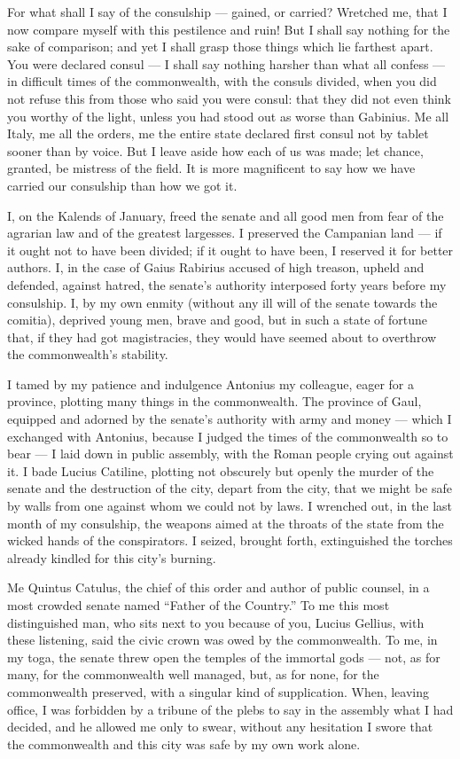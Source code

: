  For what shall I say of the consulship — gained, or carried? Wretched me, that I now compare myself with this pestilence and ruin! But I shall say nothing for the sake of comparison; and yet I shall grasp those things which lie farthest apart. You were declared consul — I shall say nothing harsher than what all confess — in difficult times of the commonwealth, with the consuls divided, when you did not refuse this from those who said you were consul: that they did not even think you worthy of the light, unless you had stood out as worse than Gabinius. Me all Italy, me all the orders, me the entire state declared first consul not by tablet sooner than by voice. But I leave aside how each of us was made; let chance, granted, be mistress of the field. It is more magnificent to say how we have carried our consulship than how we got it.

 I, on the Kalends of January, freed the senate and all good men from fear of the agrarian law and of the greatest largesses. I preserved the Campanian land — if it ought not to have been divided; if it ought to have been, I reserved it for better authors. I, in the case of Gaius Rabirius accused of high treason, upheld and defended, against hatred, the senate's authority interposed forty years before my consulship. I, by my own enmity (without any ill will of the senate towards the comitia), deprived young men, brave and good, but in such a state of fortune that, if they had got magistracies, they would have seemed about to overthrow the commonwealth's stability.

 I tamed by my patience and indulgence Antonius my colleague, eager for a province, plotting many things in the commonwealth. The province of Gaul, equipped and adorned by the senate's authority with army and money — which I exchanged with Antonius, because I judged the times of the commonwealth so to bear — I laid down in public assembly, with the Roman people crying out against it. I bade Lucius Catiline, plotting not obscurely but openly the murder of the senate and the destruction of the city, depart from the city, that we might be safe by walls from one against whom we could not by laws. I wrenched out, in the last month of my consulship, the weapons aimed at the throats of the state from the wicked hands of the conspirators. I seized, brought forth, extinguished the torches already kindled for this city's burning.

 Me Quintus Catulus, the chief of this order and author of public counsel, in a most crowded senate named ``Father of the Country.'' To me this most distinguished man, who sits next to you because of you, Lucius Gellius, with these listening, said the civic crown was owed by the commonwealth. To me, in my toga, the senate threw open the temples of the immortal gods — not, as for many, for the commonwealth well managed, but, as for none, for the commonwealth preserved, with a singular kind of supplication. When, leaving office, I was forbidden by a tribune of the plebs to say in the assembly what I had decided, and he allowed me only to swear, without any hesitation I swore that the commonwealth and this city was safe by my own work alone.

